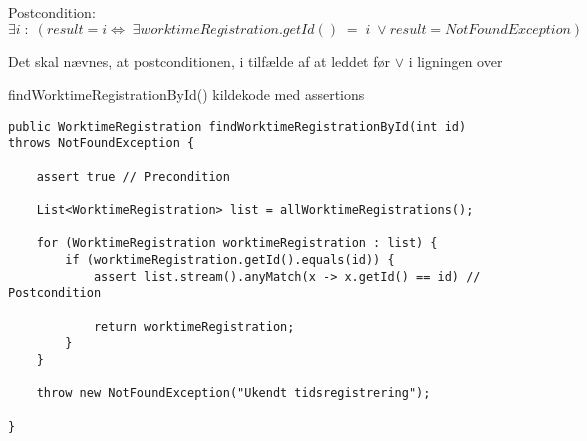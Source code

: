 

\noindent
Postcondition: 
\begin{equation}
    \exists i\; :\; (result = i \iff\; \exists worktimeRegistration.getId() \; = \; i\; \lor result = NotFoundException)
\end{equation}\label{postcondition 1}

Det skal nævnes, at postconditionen, i tilfælde af at leddet før $\lor$ i ligningen over 


\begin{listing}[H]
    \centering
    \caption{findWorktimeRegistrationById() kildekode med assertions}\label{lst:find_work_time_registration_by_id_assertions}
    \begin{verbatim}
public WorktimeRegistration findWorktimeRegistrationById(int id) throws NotFoundException {

    assert true // Precondition
    
    List<WorktimeRegistration> list = allWorktimeRegistrations();

    for (WorktimeRegistration worktimeRegistration : list) {
        if (worktimeRegistration.getId().equals(id)) {
            assert list.stream().anyMatch(x -> x.getId() == id) // Postcondition
            
            return worktimeRegistration;
        }
    }

    throw new NotFoundException("Ukendt tidsregistrering");

}
    \end{verbatim}
\end{listing}


